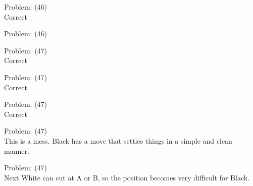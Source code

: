 \documentclass[11pt]{article}
\begin{document}
\begin{minipage}[t]{0.5\textwidth}
  {\centering
  
  Problem: (46)\\
  Correct\\
  }
\end{minipage}
\begin{minipage}[t]{0.5\textwidth}
  {\centering
  
  Problem: (46)\\
  
  }
\end{minipage}
\begin{minipage}[t]{0.5\textwidth}
  {\centering
  
  Problem: (47)\\
  Correct\\
  }
\end{minipage}
\begin{minipage}[t]{0.5\textwidth}
  {\centering
  
  Problem: (47)\\
  Correct\\
  }
\end{minipage}
\begin{minipage}[t]{0.5\textwidth}
  {\centering
  
  Problem: (47)\\
  Correct\\
  }
\end{minipage}
\begin{minipage}[t]{0.5\textwidth}
  {\centering
  
  Problem: (47)\\
  This is a mess. Black has a move that settles things in a simple and clean manner.\\
  }
\end{minipage}
\begin{minipage}[t]{0.5\textwidth}
  {\centering
  
  Problem: (47)\\
  Next White can cut at A or B, so the position becomes very difficult for Black.\\
  }
\end{minipage}
\end{document}
